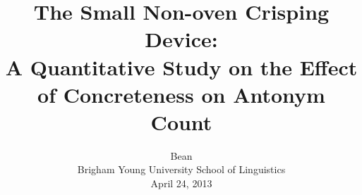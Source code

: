 \title{The Small Non-oven Crisping Device:\\
A Quantitative Study on the Effect of Concreteness on Antonym Count}

\renewcommand{\today}{April 24, 2013}
\author{Bean\\
Brigham Young University School of Linguistics\\
\today}
\maketitle
